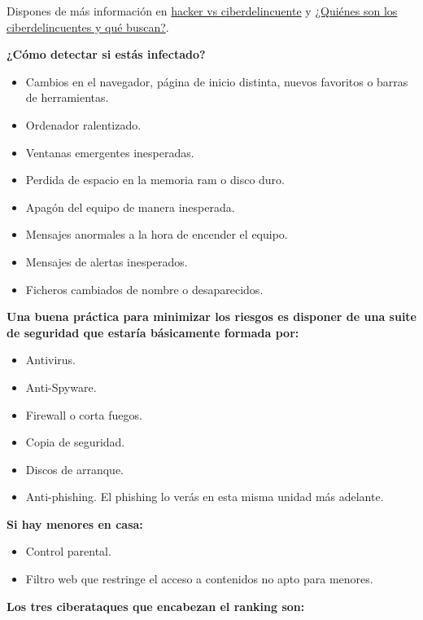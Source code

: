 \documentclass[
  a4paper,
  openany]{book}
\begin{document}
Dispones de más información en \href{https://www.incibe.es/aprendeciberseguridad/hacker-vs-ciberdelincuente}{hacker vs ciberdelincuente} y \href{https://www.osi.es/es/campanas/los-ciberdelincuentes-quienes-son/quienes-son-los-ciberdelincuentes-y-que-buscan}{¿Quiénes son los ciberdelincuentes y qué buscan?}.

\textbf{¿Cómo detectar si estás infectado?}

\begin{itemize}
\item
  Cambios en el navegador, página de inicio distinta, nuevos favoritos o barras de herramientas.
\item
  Ordenador ralentizado.
\item
  Ventanas emergentes inesperadas.
\item
  Perdida de espacio en la memoria ram o disco duro.
\item
  Apagón del equipo de manera inesperada.
\item
  Mensajes anormales a la hora de encender el equipo.
\item
  Mensajes de alertas inesperados.
\item
  Ficheros cambiados de nombre o desaparecidos.
\end{itemize}

\textbf{Una buena práctica para minimizar los riesgos es disponer de una suite de seguridad que estaría básicamente formada por:}

\begin{itemize}
\item
  Antivirus.
\item
  Anti-Spyware.
\item
  Firewall o corta fuegos.
\item
  Copia de seguridad.
\item
  Discos de arranque.
\item
  Anti-phishing. El phishing lo verás en esta misma unidad más adelante.
\end{itemize}

\textbf{Si hay menores en casa:}

\begin{itemize}
\item
  Control parental.
\item
  Filtro web que restringe el acceso a contenidos no apto para menores.
\end{itemize}

\textbf{Los tres ciberataques que encabezan el ranking son:}
\end{document}
